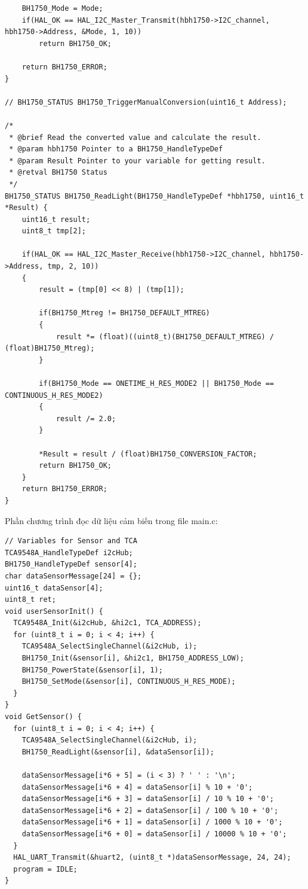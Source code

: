 \begin{lstlisting}
    BH1750_Mode = Mode;
    if(HAL_OK == HAL_I2C_Master_Transmit(hbh1750->I2C_channel, hbh1750->Address, &Mode, 1, 10))
        return BH1750_OK;

    return BH1750_ERROR;
}

// BH1750_STATUS BH1750_TriggerManualConversion(uint16_t Address);

/*
 * @brief Read the converted value and calculate the result.
 * @param hbh1750 Pointer to a BH1750_HandleTypeDef
 * @param Result Pointer to your variable for getting result.
 * @retval BH1750 Status
 */
BH1750_STATUS BH1750_ReadLight(BH1750_HandleTypeDef *hbh1750, uint16_t *Result) {
    uint16_t result;
    uint8_t tmp[2];

    if(HAL_OK == HAL_I2C_Master_Receive(hbh1750->I2C_channel, hbh1750->Address, tmp, 2, 10))
    {
        result = (tmp[0] << 8) | (tmp[1]);

        if(BH1750_Mtreg != BH1750_DEFAULT_MTREG)
        {
            result *= (float)((uint8_t)(BH1750_DEFAULT_MTREG) / (float)BH1750_Mtreg);
        }

        if(BH1750_Mode == ONETIME_H_RES_MODE2 || BH1750_Mode == CONTINUOUS_H_RES_MODE2)
        {
            result /= 2.0;
        }

        *Result = result / (float)BH1750_CONVERSION_FACTOR;
        return BH1750_OK;
    }
    return BH1750_ERROR;
}
\end{lstlisting}



Phần chương trình đọc dữ liệu cảm biến trong file main.c:
\begin{lstlisting}
// Variables for Sensor and TCA
TCA9548A_HandleTypeDef i2cHub;
BH1750_HandleTypeDef sensor[4];
char dataSensorMessage[24] = {};
uint16_t dataSensor[4];
uint8_t ret;
void userSensorInit() {
  TCA9548A_Init(&i2cHub, &hi2c1, TCA_ADDRESS);
  for (uint8_t i = 0; i < 4; i++) {
    TCA9548A_SelectSingleChannel(&i2cHub, i);
    BH1750_Init(&sensor[i], &hi2c1, BH1750_ADDRESS_LOW);
    BH1750_PowerState(&sensor[i], 1);
    BH1750_SetMode(&sensor[i], CONTINUOUS_H_RES_MODE);
  }
}
void GetSensor() {
  for (uint8_t i = 0; i < 4; i++) {
    TCA9548A_SelectSingleChannel(&i2cHub, i);
    BH1750_ReadLight(&sensor[i], &dataSensor[i]);

    dataSensorMessage[i*6 + 5] = (i < 3) ? ' ' : '\n';
    dataSensorMessage[i*6 + 4] = dataSensor[i] % 10 + '0';
    dataSensorMessage[i*6 + 3] = dataSensor[i] / 10 % 10 + '0';
    dataSensorMessage[i*6 + 2] = dataSensor[i] / 100 % 10 + '0';
    dataSensorMessage[i*6 + 1] = dataSensor[i] / 1000 % 10 + '0';
    dataSensorMessage[i*6 + 0] = dataSensor[i] / 10000 % 10 + '0';
  }
  HAL_UART_Transmit(&huart2, (uint8_t *)dataSensorMessage, 24, 24);
  program = IDLE;
}
\end{lstlisting}

